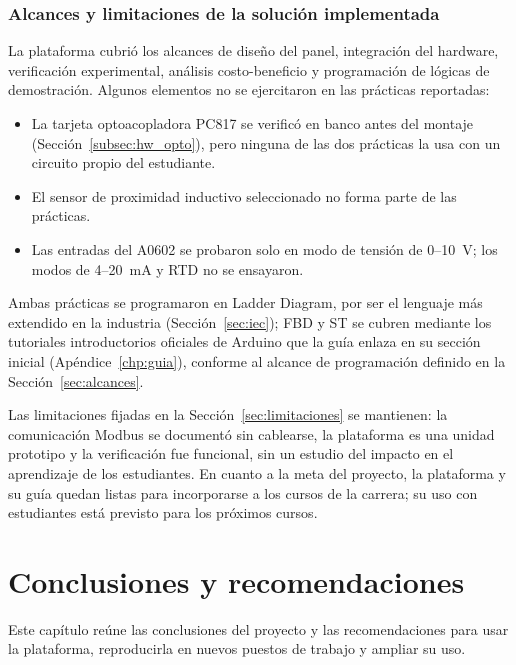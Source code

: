 \documentclass[12pt,a4paper,oneside]{report}
\begin{document}
\subsection{Alcances y limitaciones de la solución implementada}

La plataforma cubrió los alcances de diseño del panel, integración del hardware, verificación experimental, análisis costo-beneficio y programación de lógicas de demostración. Algunos elementos no se ejercitaron en las prácticas reportadas:

\begin{itemize}
    \item La tarjeta optoacopladora PC817 se verificó en banco antes del montaje (Sección~\ref{subsec:hw_opto}), pero ninguna de las dos prácticas la usa con un circuito propio del estudiante.
    \item El sensor de proximidad inductivo seleccionado no forma parte de las prácticas.
    \item Las entradas del A0602 se probaron solo en modo de tensión de 0--10~V; los modos de 4--20~mA y RTD no se ensayaron.
\end{itemize}

Ambas prácticas se programaron en Ladder Diagram, por ser el lenguaje más extendido en la industria (Sección~\ref{sec:iec}); FBD y ST se cubren mediante los tutoriales introductorios oficiales de Arduino que la guía enlaza en su sección inicial (Apéndice~\ref{chp:guia}), conforme al alcance de programación definido en la Sección~\ref{sec:alcances}.

Las limitaciones fijadas en la Sección~\ref{sec:limitaciones} se mantienen: la comunicación Modbus se documentó sin cablearse, la plataforma es una unidad prototipo y la verificación fue funcional, sin un estudio del impacto en el aprendizaje de los estudiantes. En cuanto a la meta del proyecto, la plataforma y su guía quedan listas para incorporarse a los cursos de la carrera; su uso con estudiantes está previsto para los próximos cursos.

\chapter{Conclusiones y recomendaciones}
\label{chp:conclusiones}

Este capítulo reúne las conclusiones del proyecto y las recomendaciones para usar la plataforma, reproducirla en nuevos puestos de trabajo y ampliar su uso.
\end{document}
